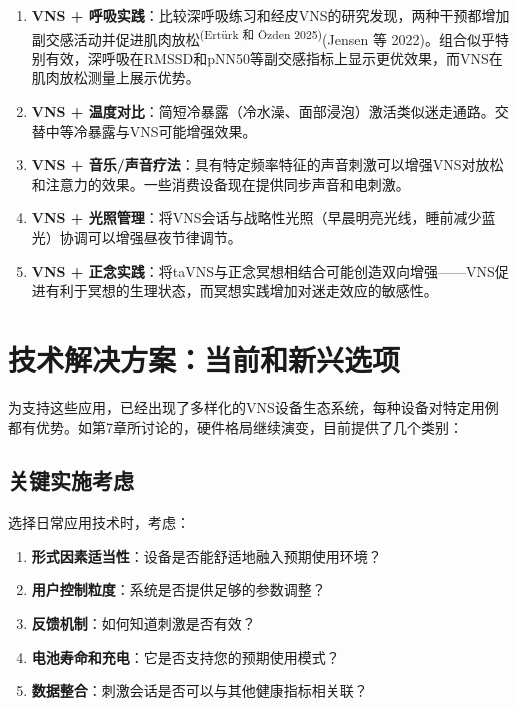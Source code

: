 \documentclass[
  Letterpaper,
]{scrbook}
\providecommand{\tightlist}{%
  \setlength{\itemsep}{0pt}\setlength{\parskip}{0pt}}\usepackage{longtable,booktabs,array}
\begin{document}
\begin{enumerate}
\def\labelenumi{\arabic{enumi}.}
\item
  \textbf{VNS +
  呼吸实践}：比较深呼吸练习和经皮VNS的研究发现，两种干预都增加副交感活动并促进肌肉放松\textsuperscript{(Ertürk
  和 Özden 2025)}(Jensen 等
  2022)。组合似乎特别有效，深呼吸在RMSSD和pNN50等副交感指标上显示更优效果，而VNS在肌肉放松测量上展示优势。
\item
  \textbf{VNS +
  温度对比}：简短冷暴露（冷水澡、面部浸泡）激活类似迷走通路。交替中等冷暴露与VNS可能增强效果。
\item
  \textbf{VNS +
  音乐/声音疗法}：具有特定频率特征的声音刺激可以增强VNS对放松和注意力的效果。一些消费设备现在提供同步声音和电刺激。
\item
  \textbf{VNS +
  光照管理}：将VNS会话与战略性光照（早晨明亮光线，睡前减少蓝光）协调可以增强昼夜节律调节。
\item
  \textbf{VNS +
  正念实践}：将taVNS与正念冥想相结合可能创造双向增强------VNS促进有利于冥想的生理状态，而冥想实践增加对迷走效应的敏感性。
\end{enumerate}

\section{技术解决方案：当前和新兴选项}\label{ux6280ux672fux89e3ux51b3ux65b9ux6848ux5f53ux524dux548cux65b0ux5174ux9009ux9879}

为支持这些应用，已经出现了多样化的VNS设备生态系统，每种设备对特定用例都有优势。如第7章所讨论的，硬件格局继续演变，目前提供了几个类别：

\subsection{关键实施考虑}\label{ux5173ux952eux5b9eux65bdux8003ux8651}

选择日常应用技术时，考虑：

\begin{enumerate}
\def\labelenumi{\arabic{enumi}.}
\tightlist
\item
  \textbf{形式因素适当性}：设备是否能舒适地融入预期使用环境？
\item
  \textbf{用户控制粒度}：系统是否提供足够的参数调整？
\item
  \textbf{反馈机制}：如何知道刺激是否有效？
\item
  \textbf{电池寿命和充电}：它是否支持您的预期使用模式？
\item
  \textbf{数据整合}：刺激会话是否可以与其他健康指标相关联？
\end{enumerate}
\end{document}
